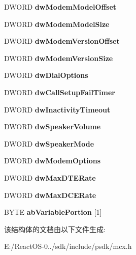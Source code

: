 \begin{DoxyCompactItemize}
D\+W\+O\+RD {\bfseries dw\+Modem\+Model\+Offset}
\item 
\mbox{\label{struct___m_o_d_e_m_d_e_v_c_a_p_s_ac9bdb8621bbd4a25e403a2a6fb60314d}} 
D\+W\+O\+RD {\bfseries dw\+Modem\+Model\+Size}
\item 
\mbox{\label{struct___m_o_d_e_m_d_e_v_c_a_p_s_a58ce757e82334a25147a786b94bd748b}} 
D\+W\+O\+RD {\bfseries dw\+Modem\+Version\+Offset}
\item 
\mbox{\label{struct___m_o_d_e_m_d_e_v_c_a_p_s_adccf0805fec14ee97c5be6fac5c2ef3d}} 
D\+W\+O\+RD {\bfseries dw\+Modem\+Version\+Size}
\item 
\mbox{\label{struct___m_o_d_e_m_d_e_v_c_a_p_s_a9b57e168e201610d0b0188ff2b747fa2}} 
D\+W\+O\+RD {\bfseries dw\+Dial\+Options}
\item 
\mbox{\label{struct___m_o_d_e_m_d_e_v_c_a_p_s_ab9148a304c52c25c9bcb009b8b6c2f17}} 
D\+W\+O\+RD {\bfseries dw\+Call\+Setup\+Fail\+Timer}
\item 
\mbox{\label{struct___m_o_d_e_m_d_e_v_c_a_p_s_ae03f29f2ec986729f3d7765a0c76ab4c}} 
D\+W\+O\+RD {\bfseries dw\+Inactivity\+Timeout}
\item 
\mbox{\label{struct___m_o_d_e_m_d_e_v_c_a_p_s_a846a8b88aec0c92de054b7fd896f6b84}} 
D\+W\+O\+RD {\bfseries dw\+Speaker\+Volume}
\item 
\mbox{\label{struct___m_o_d_e_m_d_e_v_c_a_p_s_a618543019944f08dd35af22f8c603b98}} 
D\+W\+O\+RD {\bfseries dw\+Speaker\+Mode}
\item 
\mbox{\label{struct___m_o_d_e_m_d_e_v_c_a_p_s_a74522e6a278e13eccc7a0c4ee053e401}} 
D\+W\+O\+RD {\bfseries dw\+Modem\+Options}
\item 
\mbox{\label{struct___m_o_d_e_m_d_e_v_c_a_p_s_a4a68e7a626edc5a42820690d5d1adeb7}} 
D\+W\+O\+RD {\bfseries dw\+Max\+D\+T\+E\+Rate}
\item 
\mbox{\label{struct___m_o_d_e_m_d_e_v_c_a_p_s_a042b60aad7c1833e8afc8660079d9faf}} 
D\+W\+O\+RD {\bfseries dw\+Max\+D\+C\+E\+Rate}
\item 
\mbox{\label{struct___m_o_d_e_m_d_e_v_c_a_p_s_a75f0fa47ff4aedae5ddf37a86dfd8e38}} 
B\+Y\+TE {\bfseries ab\+Variable\+Portion} \mbox{[}1\mbox{]}
\end{DoxyCompactItemize}


该结构体的文档由以下文件生成\+:\begin{DoxyCompactItemize}
\item 
E\+:/\+React\+O\+S-\/0../sdk/include/psdk/mcx.\+h\end{DoxyCompactItemize}
